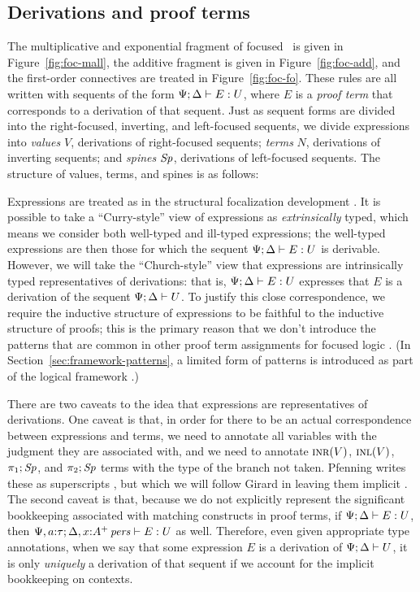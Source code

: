 \subsection{Derivations and proof terms}
\label{sec:ord-proof-terms}





The multiplicative and exponential fragment of focused \ollll~is given
in Figure~\ref{fig:foc-mall}, the additive fragment is given in
Figure~\ref{fig:foc-add}, and the first-order connectives are treated
in Figure~\ref{fig:foc-fo}. These rules are all written with sequents
of the form ${\Psi}; {\Delta} \vdash {E} : {U}$, where $E$ is a {\it proof
  term} that corresponds to a derivation of that sequent. Just
as sequent forms are divided into the right-focused, inverting, and
left-focused sequents, we divide expressions into {\it values} $V$,
derivations of right-focused sequents; {\it terms} $N$,
derivations of inverting sequents; and {\it spines} ${\it Sp}$,
derivations of left-focused sequents. The structure of
values, terms, and spines is as follows:


Expressions are treated as in the structural focalization development
\cite{simmons11structural}. It is possible to take a ``Curry-style''
view of expressions as {\it extrinsically} typed, which means we
consider both well-typed and ill-typed expressions; the well-typed
expressions are then those for which the sequent
${\Psi}; {\Delta} \vdash {E} : {U}$ is derivable. However, we will take the
``Church-style'' view that expressions are intrinsically typed
representatives of derivations: that is, ${\Psi}; {\Delta} \vdash {E} : {U}$
expresses that $E$ is a derivation of the sequent
${\Psi};{\Delta} \vdash {U} \mathstrut$. To justify this close correspondence, we
require the inductive structure of expressions to be faithful to the
inductive structure of proofs; this is the primary reason that we
don't introduce the patterns that are common in other proof term
assignments for focused logic
\cite{watkins02concurrent,licata08focusing,krishnaswami09focusing}.
(In Section~\ref{sec:framework-patterns}, a limited form of patterns
is introduced as part of the logical framework \sls.)

There are two caveats to the idea that expressions are representatives
of derivations. One caveat is that, in order for there to be an actual
correspondence between expressions and terms, we need to annotate all
variables with the judgment they are associated with, and we need to
annotate $\textsc{inr}({V})$, $\textsc{inl}({V})$, $\pi_1;{{\it Sp}}$, and $\pi_2;{{\it Sp}}$
terms with the type of the branch not taken. Pfenning writes these as
superscripts \cite{pfenning08church}, but which we will follow Girard
in leaving them implicit \cite{girard89proofs}. The second caveat is
that, because we do not explicitly represent the significant
bookkeeping associated with matching constructs in proof terms, if
${\Psi}; {\Delta} \vdash {E} : {U}$, then ${\Psi, a{:}\tau}; {\Delta,
  x{:}{A^+}\,{{\it pers}}} \vdash {E} : {U}$ as well. Therefore, even given appropriate
type annotations, when we say that some expression $E$ is a derivation
of ${\Psi};{\Delta} \vdash {U} \mathstrut$, it is only {\it uniquely} a derivation of
that sequent if we account for the implicit bookkeeping on contexts.

